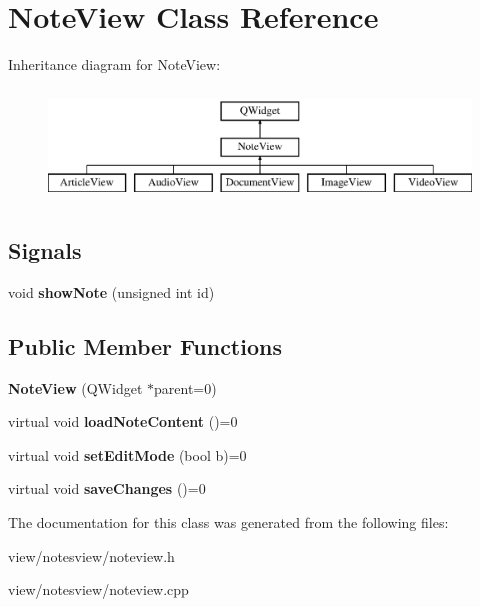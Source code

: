 \hypertarget{class_note_view}{\section{Note\-View Class Reference}
\label{class_note_view}
}
Inheritance diagram for Note\-View\-:\begin{figure}[H]
\begin{center}
\leavevmode
\includegraphics[height=3.000000cm]{class_note_view}
\end{center}
\end{figure}
\subsection*{Signals}
\begin{DoxyCompactItemize}
\item 
\hypertarget{class_note_view_aba31d7f99bc2c276cc331f1998548730}{void {\bfseries show\-Note} (unsigned int id)}\label{class_note_view_aba31d7f99bc2c276cc331f1998548730}

\end{DoxyCompactItemize}
\subsection*{Public Member Functions}
\begin{DoxyCompactItemize}
\item 
\hypertarget{class_note_view_a798efa94e662e38c2cf54248071d09b4}{{\bfseries Note\-View} (Q\-Widget $\ast$parent=0)}\label{class_note_view_a798efa94e662e38c2cf54248071d09b4}

\item 
\hypertarget{class_note_view_a509f5b21f5a23c8f66ff7747a4a250a7}{virtual void {\bfseries load\-Note\-Content} ()=0}\label{class_note_view_a509f5b21f5a23c8f66ff7747a4a250a7}

\item 
\hypertarget{class_note_view_a4e1be01f1924c848fbc94e3f57c1c5d6}{virtual void {\bfseries set\-Edit\-Mode} (bool b)=0}\label{class_note_view_a4e1be01f1924c848fbc94e3f57c1c5d6}

\item 
\hypertarget{class_note_view_a9d8ed98c0a31cb306032718f396c4181}{virtual void {\bfseries save\-Changes} ()=0}\label{class_note_view_a9d8ed98c0a31cb306032718f396c4181}

\end{DoxyCompactItemize}


The documentation for this class was generated from the following files\-:\begin{DoxyCompactItemize}
\item 
view/notesview/noteview.\-h\item 
view/notesview/noteview.\-cpp\end{DoxyCompactItemize}
